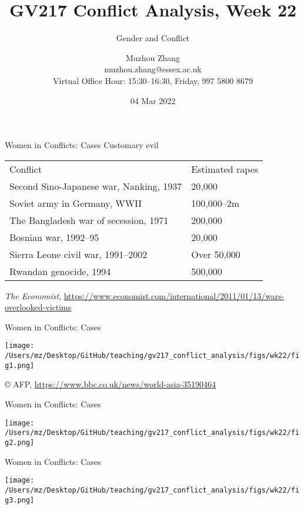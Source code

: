 \documentclass[handout]{beamer}
\title{GV217 Conflict Analysis, Week 22}
\subtitle{Gender and Conflict}
\author{Muzhou Zhang\\ muzhou.zhang@essex.ac.uk\\ Virtual Office Hour: 15:30--16:30, Friday, 997 5800 8679}
\date{04 Mar 2022}
\begin{document}
\maketitle
{}

\begin{frame}{Women in Conflicts: Cases}
    \pause
    Customary evil
    \begin{tabular}{ll}
        Conflict                                                    & Estimated rapes \\
        Second Sino-Japanese war, Nanking, 1937                     & 20,000          \\
        Soviet army in Germany, WWII                                & 100,000--2m     \\
        The Bangladesh war of secession, 1971                       & 200,000         \\
        Bosnian war, 1992--95                                       & 20,000          \\
        Sierra Leone civil war, 1991--2002                          & Over 50,000     \\
        Rwandan genocide, 1994                                      & 500,000        
    \end{tabular}
    \tiny \emph{The Economist}, \url{https://www.economist.com/international/2011/01/13/wars-overlooked-victims}
\end{frame}

\begin{frame}{Women in Conflicts: Cases}
    \pause
    \begin{center}
        \texttt{[image: /Users/mz/Desktop/GitHub/teaching/gv217\_conflict\_analysis/figs/wk22/fig1.png]}
    \end{center}
    \tiny © AFP, \url{https://www.bbc.co.uk/news/world-asia-35190464}
\end{frame}

\begin{frame}{Women in Conflicts: Cases}
    \pause
    \begin{center}
        \texttt{[image: /Users/mz/Desktop/GitHub/teaching/gv217\_conflict\_analysis/figs/wk22/fig2.png]}
    \end{center}
\end{frame}

\begin{frame}{Women in Conflicts: Cases}
    \pause
    \begin{center}
        \texttt{[image: /Users/mz/Desktop/GitHub/teaching/gv217\_conflict\_analysis/figs/wk22/fig3.png]}
    \end{center}
\end{frame}
\end{document}
